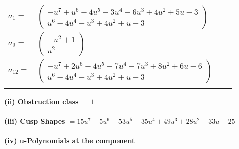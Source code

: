 \documentclass[1p]{elsarticle_modified}
\theoremstyle{definition}
\begin{document}
\begin{tabular}{m{7pt} m{180pt} m{7pt} m{180pt} }
\flushright $a_{1}=$&$\begin{pmatrix}- u^7+u^6+4 u^5-3 u^4-6 u^3+4 u^2+5 u-3\\u^6-4 u^4- u^3+4 u^2+u-3\end{pmatrix}$ \\
\flushright $a_{9}=$&$\begin{pmatrix}- u^2+1\\u^2\end{pmatrix}$ \\
\flushright $a_{12}=$&$\begin{pmatrix}- u^7+2 u^6+4 u^5-7 u^4-7 u^3+8 u^2+6 u-6\\u^6-4 u^4- u^3+4 u^2+u-3\end{pmatrix}$\\&\end{tabular}
\flushleft \textbf{(ii) Obstruction class $= 1$}\\~\\
\flushleft \textbf{(iii) Cusp Shapes $= 15 u^7+5 u^6-53 u^5-35 u^4+49 u^3+28 u^2-33 u-25$}\\~\\
\newpage\renewcommand{\arraystretch}{1}
\flushleft \textbf{(iv) u-Polynomials at the component}\newline \\
\end{document}
